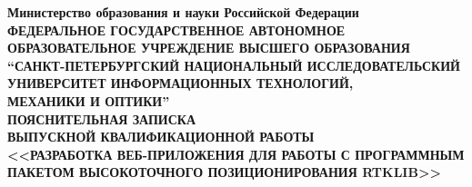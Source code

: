 
\renewcommand{\strut}{\rule[-.12\baselineskip]{0pt}{\baselineskip}}

\thispagestyle{empty}

\begin{center}
  {
    \bfseries
    {
      \subnormal
      Министерство образования и науки Российской Федерации
    } \\[-0.5em]
    {
      \scriptsize
      ФЕДЕРАЛЬНОЕ ГОСУДАРСТВЕННОЕ АВТОНОМНОЕ ОБРАЗОВАТЕЛЬНОЕ УЧРЕЖДЕНИЕ ВЫСШЕГО ОБРАЗОВАНИЯ
    } \\[-0.25em]
    {
      \subnormal
      “САНКТ-ПЕТЕРБУРГСКИЙ НАЦИОНАЛЬНЫЙ ИССЛЕДОВАТЕЛЬСКИЙ \\[-0.5em]
      УНИВЕРСИТЕТ ИНФОРМАЦИОННЫХ ТЕХНОЛОГИЙ, \\[-0.75em]
      МЕХАНИКИ И ОПТИКИ”
    } \\[0.25em]
    {
      \normalsize
      ПОЯСНИТЕЛЬНАЯ ЗАПИСКА \\[-0.5em]
      ВЫПУСКНОЙ КВАЛИФИКАЦИОННОЙ РАБОТЫ
    } \\[5.75em]
    {
      \normalsize
      <<РАЗРАБОТКА ВЕБ-ПРИЛОЖЕНИЯ ДЛЯ РАБОТЫ С ПРОГРАММНЫМ \\[-0.5em]
      ПАКЕТОМ ВЫСОКОТОЧНОГО ПОЗИЦИОНИРОВАНИЯ RTKLIB>>
    } \\[6.75em]
  }
\end{center}

